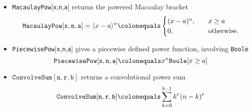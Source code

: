 \documentclass[12pt, letterpaper]{amsart}
\newenvironment{myitemize}
{ \begin{itemize}
    \setlength{\itemsep}{4pt}
    \setlength{\parskip}{4pt}
    \setlength{\parsep}{4pt}     }
{ \end{itemize}                  }
\newcommand \power [2]{\langle #1 \rangle^{#2}}
\newcommand \MacaulayPow [4][MacaulayPow]{\texttt{#1}[{\texttt{#2}},{\texttt{#3}},{\texttt{#4}}]}
\newcommand \PiecewisePow [4][PiecewisePow]{\texttt{#1}[{\texttt{#2}},{\texttt{#3}},{\texttt{#4}}]}
\newcommand \ConvolveSum [4][ConvolveSum]{\texttt{{#1}} [{\texttt{#2}},{\texttt{#3}},{\texttt{#4}}]}
\theoremstyle{definition}
\theoremstyle{remark}
\numberwithin{equation}{section}
\begin{document}
\begin{myitemize}
\item \MacaulayPow{x}{n}{a} returns the powered Macaulay bracket
\begin{equation*}
\MacaulayPow{x}{n}{a}=\power{x-a}{n} \colonequals
\begin{cases}
(x-a)^n, &\quad x\geq a \\
0, &\quad \mathrm{otherwise}.
\end{cases}
\end{equation*}
\item \PiecewisePow{x}{n}{a} gives a piecewise defined power function, involving \texttt{Boole}
\begin{equation*}
\PiecewisePow{x}{n}{a} \colonequals x^n\texttt{Boole}[x\geq a]
\end{equation*}
\item $\ConvolveSum{n}{r}{b}$ returns a convolutional power sum
\begin{equation*}
\label{q_definition}
\ConvolveSum{n}{r}{b} \colonequals \sum_{k=0}^{b-1} k^r(n-k)^r
\end{equation*}
\end{myitemize}
\end{document}
